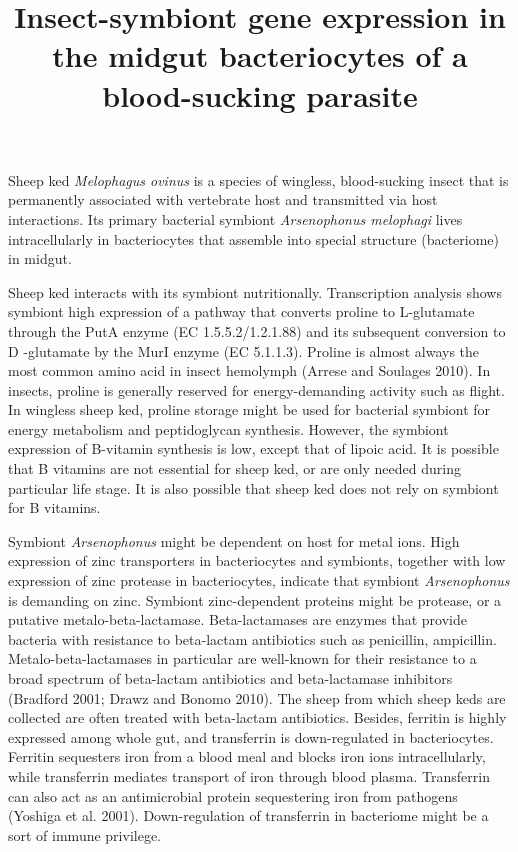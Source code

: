 \documentclass[11pt]{article}
\title{Insect-symbiont gene expression in the midgut bacteriocytes of a blood-sucking parasite}
\author{}
\date{}
\begin{document}
  \maketitle

  \linenumbers
Sheep ked \textit{Melophagus ovinus} is a species of wingless, blood-sucking insect that is permanently associated with vertebrate host and transmitted via host interactions. 
Its primary bacterial symbiont \textit{Arsenophonus melophagi} lives intracellularly in bacteriocytes that assemble into special structure (bacteriome) in midgut. 

\newline

Sheep ked interacts with its symbiont nutritionally. 
Transcription analysis shows symbiont high expression of a pathway that converts proline to L-glutamate through the PutA enzyme (EC 1.5.5.2/1.2.1.88) and its subsequent conversion to D -glutamate by the MurI enzyme (EC 5.1.1.3). 
Proline is almost always the most common amino acid in insect hemolymph (Arrese and Soulages 2010). 
In insects, proline is generally reserved for energy-demanding activity such as flight. 
In wingless sheep ked, proline storage might be used for bacterial symbiont for energy metabolism and peptidoglycan synthesis. 
However, the symbiont expression of B-vitamin synthesis is low, except that of lipoic acid. 
It is possible that B vitamins are not essential for sheep ked, or are only needed during particular life stage. 
It is also possible that sheep ked does not rely on symbiont for B vitamins.

\newline

Symbiont \textit{Arsenophonus} might be dependent on host for metal ions. 
High expression of zinc transporters in bacteriocytes and symbionts, together with low expression of zinc protease in bacteriocytes, indicate that symbiont \textit{Arsenophonus} is demanding on zinc. 
Symbiont zinc-dependent proteins might be protease, or a putative metalo-beta-lactamase. 
Beta-lactamases are enzymes that provide bacteria with resistance to beta-lactam antibiotics such as penicillin, ampicillin. 
Metalo-beta-lactamases in particular are well-known for their resistance to a broad spectrum of beta-lactam antibiotics and beta-lactamase inhibitors (Bradford 2001; Drawz and Bonomo 2010). 
The sheep from which sheep keds are collected are often treated with beta-lactam antibiotics. 
Besides, ferritin is highly expressed among whole gut, and transferrin is down-regulated in bacteriocytes. 
Ferritin sequesters iron from a blood meal and blocks iron ions intracellularly, while transferrin mediates transport of iron through blood plasma. 
Transferrin can also act as an antimicrobial protein sequestering iron from pathogens (Yoshiga et al.
2001). 
Down-regulation of transferrin in bacteriome might be a sort of immune privilege.
\end{document}
